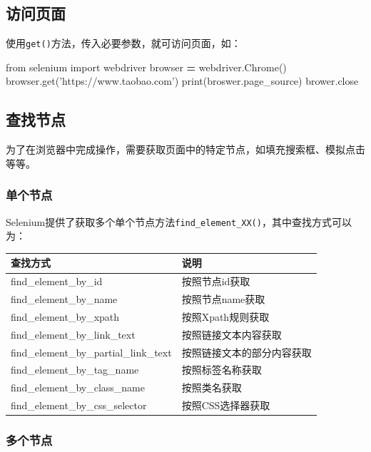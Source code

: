 \documentclass[]{ctexbook}
\newenvironment{Shaded}{\begin{snugshade}}{\end{snugshade}}
\newcommand{\BuiltInTok}[1]{#1}
\newcommand{\ImportTok}[1]{#1}
\newcommand{\NormalTok}[1]{#1}
\newcommand{\OperatorTok}[1]{\textcolor[rgb]{0.81,0.36,0.00}{\textbf{#1}}}
\newcommand{\StringTok}[1]{\textcolor[rgb]{0.31,0.60,0.02}{#1}}
\begin{document}
\hypertarget{ux8bbfux95eeux9875ux9762}{%
\subsection{访问页面}\label{ux8bbfux95eeux9875ux9762}}

使用\texttt{get()}方法，传入必要参数，就可访问页面，如：

\begin{Shaded}
\begin{Highlighting}[]
\ImportTok{from}\NormalTok{ selenium }\ImportTok{import}\NormalTok{ webdriver}
\NormalTok{browser }\OperatorTok{=}\NormalTok{ webdriver.Chrome()}
\NormalTok{browser.get(}\StringTok{'https://www.taobao.com'}\NormalTok{)}
\BuiltInTok{print}\NormalTok{(broswer.page_source)}
\NormalTok{brower.close}
\end{Highlighting}
\end{Shaded}

\hypertarget{ux67e5ux627eux8282ux70b9}{%
\subsection{查找节点}\label{ux67e5ux627eux8282ux70b9}}

为了在浏览器中完成操作，需要获取页面中的特定节点，如填充搜索框、模拟点击等等。

\hypertarget{ux5355ux4e2aux8282ux70b9}{%
\subsubsection{单个节点}\label{ux5355ux4e2aux8282ux70b9}}

Selenium提供了获取多个单个节点方法\texttt{find\_element\_XX()}，其中查找方式可以为：

\begin{longtable}[]{@{}ll@{}}
\toprule
查找方式 & 说明\tabularnewline
\midrule
\endhead
find\_element\_by\_id & 按照节点id获取\tabularnewline
find\_element\_by\_name & 按照节点name获取\tabularnewline
find\_element\_by\_xpath & 按照Xpath规则获取\tabularnewline
find\_element\_by\_link\_text & 按照链接文本内容获取\tabularnewline
find\_element\_by\_partial\_link\_text & 按照链接文本的部分内容获取\tabularnewline
find\_element\_by\_tag\_name & 按照标签名称获取\tabularnewline
find\_element\_by\_class\_name & 按照类名获取\tabularnewline
find\_element\_by\_css\_selector & 按照CSS选择器获取\tabularnewline
\bottomrule
\end{longtable}

\hypertarget{ux591aux4e2aux8282ux70b9}{%
\subsubsection{多个节点}\label{ux591aux4e2aux8282ux70b9}}
\end{document}
